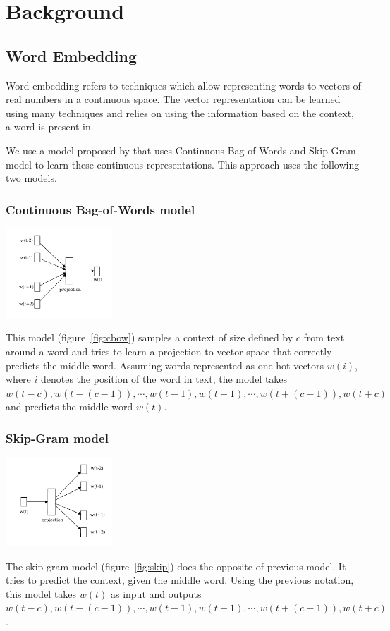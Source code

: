 \documentclass[%
 aip,
rsi,%
 amsmath,amssymb,
 reprint,%
author-year,
groupedaddress
]{revtex4-1}
\begin{document}
\section{\label{back}Background}
\subsection{Word Embedding}
Word embedding refers to techniques which allow representing words to vectors of real numbers in a continuous space. The vector representation can be learned using many techniques and relies on using the information based on the context, a word is present in.

We use a model proposed by \citet{Mikolov2013a,Mikolov2013b} that uses Continuous Bag-of-Words and Skip-Gram model to learn these continuous representations. This approach uses the following two models.

\subsubsection{Continuous Bag-of-Words model}
\begin{center}
  \includegraphics[width=0.3\textwidth]{cbow}
  \label{fig:cbow}
\end{center}
This model (figure~\ref{fig:cbow}) samples a context of size defined by $c$ from text around a word and tries to learn a projection to vector space that correctly predicts the middle word. Assuming words represented as one hot vectors $w(i)$, where $i$ denotes the position of the word in text, the model takes $w(t - c), w(t - (c - 1)), \cdots, w(t - 1), w(t + 1), \cdots, w(t + (c - 1)), w(t + c)$ and predicts the middle word $w(t)$.

\subsubsection{Skip-Gram model}
\begin{center}
  \includegraphics[width=0.3\textwidth]{skip}
  \label{fig:skip}
\end{center}
The skip-gram model (figure~\ref{fig:skip}) does the opposite of previous model. It tries to predict the context, given the middle word. Using the previous notation, this model takes $w(t)$ as input and outputs $w(t - c), w(t - (c - 1)), \cdots, w(t - 1), w(t + 1), \cdots, w(t + (c - 1)), w(t + c)$.
\end{document}
